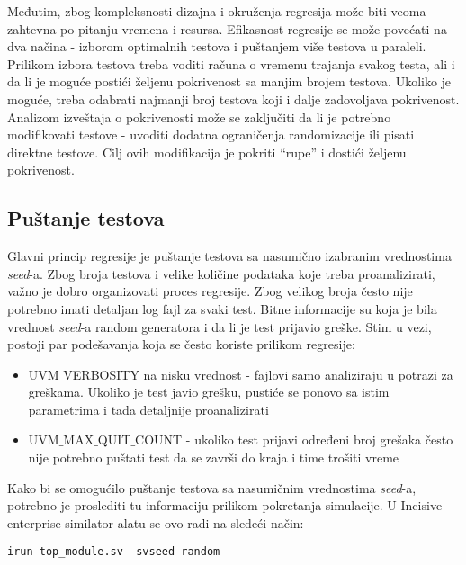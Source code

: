 Međutim, zbog kompleksnosti dizajna i okruženja regresija može biti veoma
zahtevna po pitanju vremena i resursa. Efikasnost regresije se može povećati na
dva načina - izborom optimalnih testova i puštanjem više testova u paraleli.
Prilikom izbora testova treba voditi računa o vremenu trajanja svakog testa, ali
i da li je moguće postići željenu pokrivenost sa manjim brojem testova. Ukoliko
je moguće, treba odabrati najmanji broj testova koji i dalje zadovoljava
pokrivenost.\\

Analizom izveštaja o pokrivenosti može se zaključiti da li je potrebno
modifikovati testove - uvoditi dodatna ograničenja randomizacije ili pisati
direktne testove. Cilj ovih modifikacija je pokriti ``rupe'' i dostići željenu
pokrivenost.


\subsection{Puštanje testova}

Glavni princip regresije je puštanje testova sa nasumično izabranim vrednostima
\emph{seed}-a. Zbog broja testova i velike količine podataka koje treba
proanalizirati, važno je dobro organizovati proces regresije. Zbog velikog broja
često nije potrebno imati detaljan log fajl za svaki test. Bitne informacije su
koja je bila vrednost \emph{seed}-a random generatora i da li je test prijavio
greške. Stim u vezi, postoji par podešavanja koja se često koriste prilikom
regresije:

\begin{itemize}
\item UVM\(\_\)VERBOSITY na nisku vrednost - fajlovi samo analiziraju u potrazi
  za greškama. Ukoliko je test javio grešku, pustiće se ponovo sa istim
  parametrima i tada detaljnije proanalizirati
\item UVM\(\_\)MAX\(\_\)QUIT\(\_\)COUNT - ukoliko test prijavi određeni broj
  grešaka često nije potrebno puštati test da se završi do kraja i time trošiti
  vreme
\end{itemize}

Kako bi se omogućilo puštanje testova sa nasumičnim vrednostima \emph{seed}-a,
potrebno je proslediti tu informaciju prilikom pokretanja simulacije. U
Incisive enterprise similator alatu se ovo radi na sledeći način:

\begin{lstlisting}
irun top_module.sv -svseed random
\end{lstlisting}


